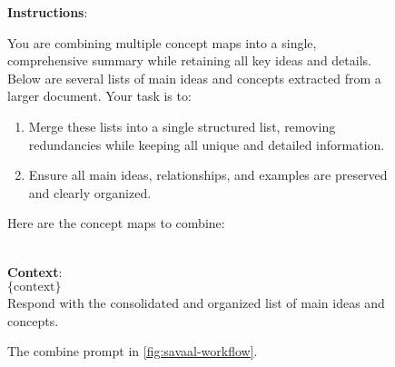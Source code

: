\begin{figure}[h]
\centering
\begin{tcolorbox}[width=1\columnwidth, fontupper=\footnotesize,title=Combine Prompt]
\RaggedRight
\obeylines
\textbf{Instructions}: \\
{You are combining multiple concept maps into a single, comprehensive summary while retaining all key ideas and details. Below are several lists of main ideas and concepts extracted from a larger document.%
\vspace{3mm}
Your task is to:
\begin{enumerate}[nosep]
    \item Merge these lists into a single structured list, removing redundancies while keeping all unique and detailed information.
    \item Ensure all main ideas, relationships, and examples are preserved and clearly organized.
\end{enumerate}
\vspace{3mm}
\vspace{3mm}
Here are the concept maps to combine:} \\
\vspace{3mm}
\vspace{3mm}
\textbf{Context}: \\
$\{\text{context}\}$ \\

Respond with the consolidated and organized list of main ideas and concepts.
\end{tcolorbox}
\caption{The combine prompt in \autoref{fig:savaal-workflow}.}
\label{fig:combine_prompt}
\end{figure}


